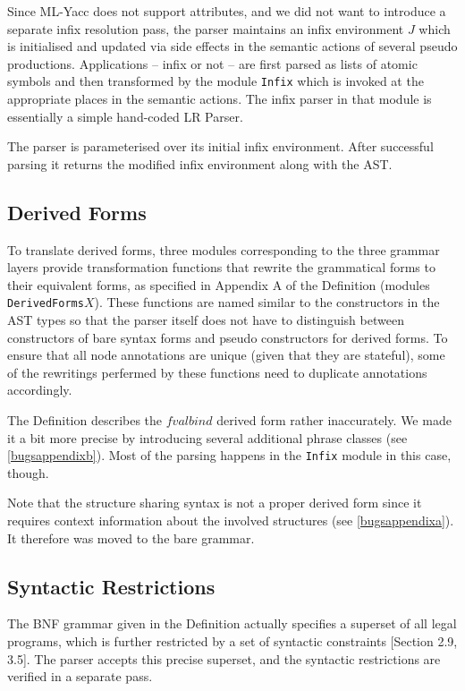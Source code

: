 \documentclass[twoside,titlepage]{article}
\begin{document}
Since ML-Yacc does not support attributes, and we did not want to introduce a separate infix resolution pass, the parser maintains an infix environment $J$ which is initialised and updated via side effects in the semantic actions of several pseudo productions. Applications -- infix or not -- are first parsed as lists of atomic symbols and then transformed by the module {\tt Infix} which is invoked at the appropriate places in the semantic actions. The infix parser in that module is essentially a simple hand-coded LR Parser.

The parser is parameterised over its initial infix environment. After successful parsing it returns the modified infix environment along with the AST.


\subsection{Derived Forms}
\label{derived}

To translate derived forms, three modules corresponding to the three grammar layers provide transformation functions that rewrite the grammatical forms to their equivalent forms, as specified in Appendix A of the Definition (modules {\tt DerivedForms$X$}). These functions are named similar to the constructors in the AST types so that the parser itself does not have to distinguish between constructors of bare syntax forms and pseudo constructors for derived forms. To ensure that all node annotations are unique (given that they are stateful), some of the rewritings perfermed by these functions need to duplicate annotations accordingly.

The Definition describes the $\mathit{fvalbind}$ derived form rather inaccurately. We made it a bit more precise by introducing several additional phrase classes (see \ref{bugsappendixb}). Most of the parsing happens in the {\tt Infix} module in this case, though.

Note that the structure sharing syntax is not a proper derived form since it requires context information about the involved structures (see \ref{bugsappendixa}). It therefore was moved to the bare grammar.


\subsection{Syntactic Restrictions}
\label{restrictions}

The BNF grammar given in the Definition actually specifies a superset of all legal programs, which is further restricted by a set of syntactic constraints [Section 2.9, 3.5]. The parser accepts this precise superset, and the syntactic restrictions are verified in a separate pass.
\end{document}
